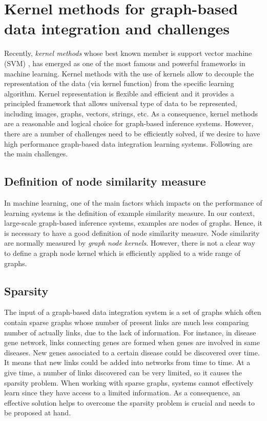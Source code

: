 \section{Kernel methods for graph-based data integration and challenges}
Recently, \textit{kernel methods} whose best known member is support vector machine (SVM) \cite{cortes1995support}, has emerged as one of the most famous and powerful frameworks in machine learning. Kernel methods with the use of kernels allow to decouple the representation of the data (via kernel function) from the specific learning algorithm. Kernel representation is flexible and efficient and it provides a principled framework that allows universal type of data to be represented, including images, graphs, vectors, strings, etc. As a consequence, kernel methods are a reasonable and logical choice for graph-based inference systems. However, there are a number of challenges need to be efficiently solved, if we desire to have high performance graph-based data integration learning systems. Following are the main challenges.
\subsection{Definition of node similarity measure}
In machine learning, one of the main factors which impacts on the performance of learning systems is the definition of example similarity measure. In our context, large-scale graph-based inference systems, examples are nodes of graphs. Hence, it is necessary to have a good definition of node similarity measure. Node similarity are normally measured by \textit{graph node kernels}. However, there is not a clear way to define a graph node kernel which is efficiently applied to a wide range of graphs.
\subsection{Sparsity}
The input of a graph-based data integration system is a set of graphs which often contain sparse graphs whose number of present links are much less comparing number of actually links, due to the lack of information. For instance, in disease gene network, links connecting genes are formed when genes are involved in same diseases. New genes associated to a certain disease could be discovered over time. It means that new links could be added into networks from time to time. At a give time, a number of links discovered can be very limited, so it causes the sparsity problem. When working with sparse graphs, systems cannot effectively learn since they have access to a limited information. As a consequence, an effective solution helps to overcome the sparsity problem is crucial and needs to be proposed at hand.
